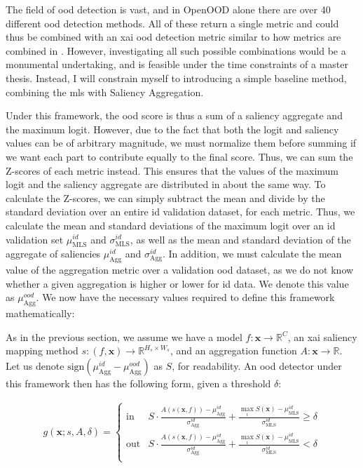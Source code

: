 \documentclass[UKenglish]{uiomasterthesis} %
\newcommand{\R}{\mathbb{R}}
\theoremstyle{definition}
\begin{document}
The field of \ac{ood} detection is vast, and in OpenOOD alone there are over 40 different \ac{ood} detection methods. All of these return a single metric and could thus be combined with an \ac{xai} \ac{ood} detection metric similar to how metrics are combined in \cite{combood}. However, investigating all such possible combinations would be a monumental undertaking, and is feasible under the time constraints of a master thesis. Instead, I will constrain myself to introducing a simple baseline method, combining the \ac{mls} with Saliency Aggregation.

Under this framework, the \ac{ood} score is thus a sum of a saliency aggregate and the maximum logit. However, due to the fact that both the logit and saliency values can be of arbitrary magnitude, we must normalize them before summing if we want each part to contribute equally to the final score. Thus, we can sum the Z-scores of each metric instead. This ensures that the values of the maximum logit and the saliency aggregate are distributed in about the same way. To calculate the Z-scores, we can simply subtract the mean and divide by the standard deviation over an entire \ac{id} validation dataset, for each metric. Thus, we calculate the mean and standard deviations of the maximum logit over an \ac{id} validation set $\mu_{\text{MLS}}^{id}$ and $\sigma_{\text{MLS}}^{id}$, as well as the mean and standard deviation of the aggregate of saliencies $\mu_{\text{Agg}}^{id}$ and $\sigma_{\text{Agg}}^{id}$. In addition, we must calculate the mean value of the aggregation metric over a validation \ac{ood} dataset, as we do not know whether a given aggregation is higher or lower for \ac{id} data. We denote this value as $\mu_{\text{Agg}}^{ood}$. We now have the necessary values required to define this framework mathematically:

As in the previous section, we assume we have a model $f: \bm{x} \to \R^C$, an \ac{xai} saliency mapping method $s: (f, \bm{x}) \to \R^{H_s \times W_s}$, and an aggregation function $A: \bm{x} \rightarrow \R$. Let us denote $\text{sign}(\mu_{\text{Agg}}^{id} - \mu_{\text{Agg}}^{ood})$ as $S$, for readability. An \ac{ood} detector under this framework then has the following form, given a threshold $\delta$:

{\large
\begin{align}
    g(\bm{x}; s, A, \delta)=\begin{cases} 
    \text{in } &  S \cdot \frac{A(s(\bm{x}, f)) - \mu_{\text{Agg}}^{id}}{\sigma_{\text{Agg}}^{id}} + \frac{\max_i S(\bm{x}) - \mu_{\text{MLS}}^{id}}{\sigma_{\text{MLS}}^{id}} \ge \delta \\[10pt]
    \text{out} &  S \cdot \frac{A(s(\bm{x}, f)) - \mu_{\text{Agg}}^{id}}{\sigma_{\text{Agg}}^{id}} + \frac{\max_i S(\bm{x}) - \mu_{\text{MLS}}^{id}}{\sigma_{\text{MLS}}^{id}} < \delta \\
   \end{cases}
\label{eq:aggregate}
\end{align}
}
\end{document}
